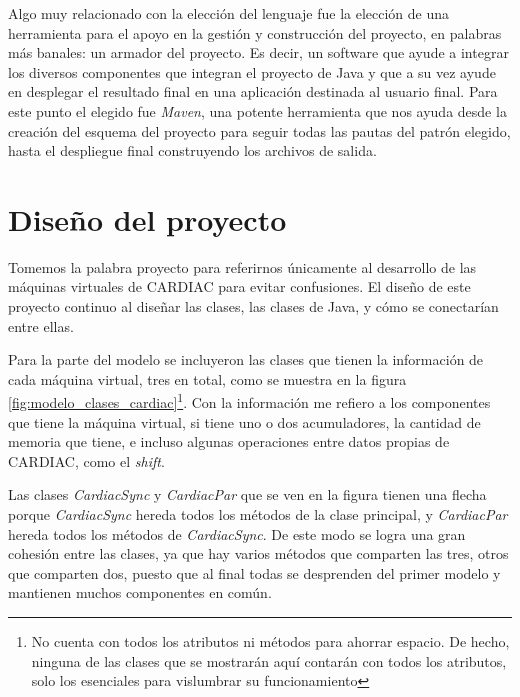 \documentclass[letterpaper,12pt,oneside]{book}
\begin{document}
	Algo muy relacionado con la elección del lenguaje fue la elección de una herramienta para el apoyo en la gestión y construcción del proyecto, en palabras más
	banales: un armador del proyecto. Es decir, un software que ayude a integrar los diversos componentes que integran el proyecto de Java y que a su vez
	ayude en desplegar el resultado final en una aplicación destinada al usuario final. Para este punto el elegido fue \textit{Maven}, una potente herramienta
	que nos ayuda desde la creación del esquema del proyecto para seguir todas las pautas del patrón elegido, hasta el despliegue final
	construyendo los archivos de salida.
	
	
	\section{Diseño del proyecto}
	
	Tomemos la palabra proyecto para referirnos únicamente al desarrollo de las máquinas virtuales de CARDIAC para evitar confusiones. El diseño de este proyecto
	continuo al diseñar las clases, las clases de Java, y cómo se conectarían entre ellas.
	
	Para la parte del modelo se incluyeron las clases que tienen la información de cada máquina virtual, tres en total, como se muestra en la figura
	\ref{fig:modelo_clases_cardiac}\footnote{No cuenta con todos los atributos ni métodos para ahorrar espacio. De hecho, ninguna de las clases que se
	mostrarán aquí contarán con todos los atributos, solo los esenciales para vislumbrar su funcionamiento}. Con la información me refiero a los 
	componentes que tiene la máquina virtual, si tiene uno o
	dos acumuladores, la cantidad de memoria que tiene, e incluso algunas operaciones entre datos propias de CARDIAC, como el \textit{shift}. 
	
	Las clases
	\textit{CardiacSync} y \textit{CardiacPar}
	que se ven en la figura tienen una flecha porque 	\textit{CardiacSync} hereda todos los métodos de la clase principal, y \textit{CardiacPar} hereda
	todos los métodos de \textit{CardiacSync}. De este modo se logra una gran cohesión entre las clases, ya que hay varios métodos que comparten las tres,
	otros que comparten dos, puesto que al final todas se desprenden del primer modelo y mantienen muchos componentes en común.
	
\end{document}
